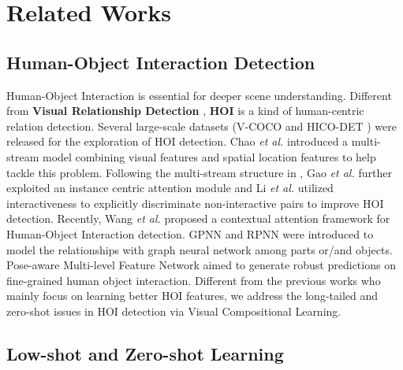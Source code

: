 \documentclass[runningheads]{llncs}
\newcommand{\etal}{\textit{et al.}}
\begin{document}
\section{Related Works}

\subsection{Human-Object Interaction Detection}
Human-Object Interaction \cite{chao2015hico, chao2018learning} is essential for deeper scene understanding. Different from {\bf Visual Relationship Detection} \cite{lu2016visual}, {\bf HOI} is a kind of human-centric relation detection. Several large-scale datasets (V-COCO \cite{gupta2015visual} and HICO-DET \cite{chao2018learning}) were released for the exploration of HOI detection. Chao \etal \cite{chao2018learning} introduced a multi-stream model combining visual features and spatial location features to help tackle this problem. Following the multi-stream structure in \cite{chao2018learning}, Gao \etal \cite{gao2018ican} further exploited an instance centric attention module and Li \etal \cite{li2018transferable} utilized interactiveness to explicitly discriminate non-interactive pairs to improve HOI detection. Recently, Wang \etal \cite{wang2019deep} proposed a contextual attention framework for Human-Object Interaction detection. GPNN \cite{qi2018learning} and RPNN \cite{Zhou_2019_ICCV} were introduced to model the relationships with graph neural network among parts or/and objects. Pose-aware Multi-level Feature Network \cite{wan2019pose} aimed to generate robust predictions on fine-grained human object interaction. Different from the previous works \cite{chao2018learning, gao2018ican, li2018transferable, qi2018learning, wang2019deep, Zhou_2019_ICCV, wan2019pose} who mainly focus on learning better HOI features, we address the long-tailed and zero-shot issues in HOI detection via Visual Compositional Learning.

\subsection{Low-shot and Zero-shot Learning}
\end{document}
